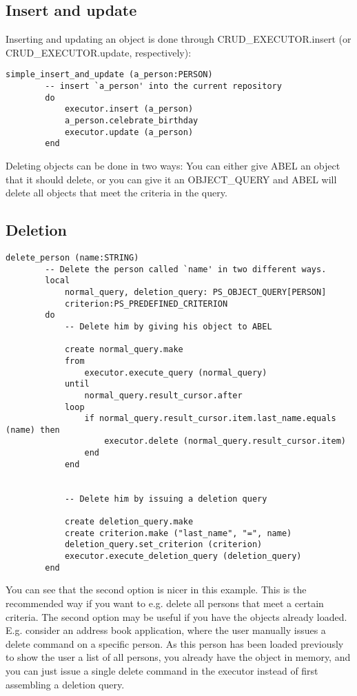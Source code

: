 \subsection{Insert and update}

Inserting and updating an object is done through CRUD\_EXECUTOR.insert (or CRUD\_EXECUTOR.update, respectively): 

\begin{lstlisting}[language=OOSC2Eiffel, captionpos=b, caption={}, label={lst:simple_insert}]
	simple_insert_and_update (a_person:PERSON)
		-- insert `a_person' into the current repository
		do
			executor.insert (a_person)
			a_person.celebrate_birthday
			executor.update (a_person)
		end
\end{lstlisting}

Deleting objects can be done in two ways: 
You can either give ABEL an object that it should delete, or you can give it an OBJECT\_QUERY and ABEL will delete all objects that meet the criteria in the query.

\subsection{Deletion}

\begin{lstlisting}[language=OOSC2Eiffel, captionpos=b, caption={}, label={lst:simple_insert}]
	delete_person (name:STRING)
		-- Delete the person called `name' in two different ways.
		local
			normal_query, deletion_query: PS_OBJECT_QUERY[PERSON]
			criterion:PS_PREDEFINED_CRITERION
		do
			-- Delete him by giving his object to ABEL

			create normal_query.make
			from
				executor.execute_query (normal_query)
			until
				normal_query.result_cursor.after
			loop
				if normal_query.result_cursor.item.last_name.equals (name) then
					executor.delete (normal_query.result_cursor.item)
				end
			end


			-- Delete him by issuing a deletion query

			create deletion_query.make
			create criterion.make ("last_name", "=", name)
			deletion_query.set_criterion (criterion)
			executor.execute_deletion_query (deletion_query)
		end
\end{lstlisting}

You can see that the second option is nicer in this example. This is the recommended way if you want to e.g. delete all persons that meet a certain criteria.
The second option may be useful if you have the objects already loaded. E.g. consider an address book application, where the user manually issues a delete command on a specific person.
As this person has been loaded previously to show the user a list of all persons, you already have the object in memory, and you can just issue a single delete command in the executor
instead of first assembling a deletion query.

